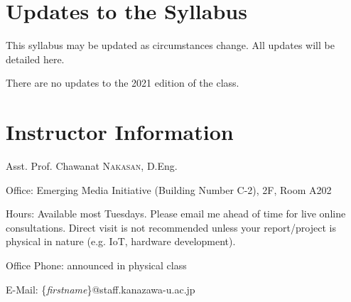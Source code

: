 \documentclass[a4paper]{article}
\begin{document}
\section{Updates to the Syllabus}

This syllabus may be updated as circumstances change. All updates will be detailed here.

There are no updates to the 2021 edition of the class.

\section*{Instructor Information}
Asst. Prof. Chawanat \textsc{Nakasan}, D.Eng.

\smallskip\noindent
Office: Emerging Media Initiative (Building Number C-2), 2F, Room A202

\smallskip\noindent
Hours: Available most Tuesdays. Please email me ahead of time for live online consultations. Direct visit is not recommended unless your report/project is physical in nature (e.g. IoT, hardware development).

\smallskip\noindent
Office Phone: announced in physical class

\smallskip\noindent
E-Mail: \{\textit{firstname}\}@staff.kanazawa-u.ac.jp
\end{document}
